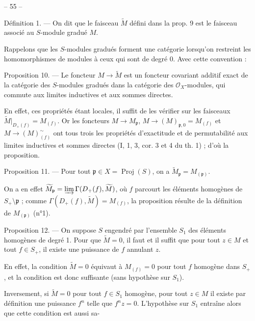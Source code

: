 \newpage


-- 55 --

Définition 1. — On dit que le faisceau $\widetilde{M}$ défini dans la prop. 9 est le faisceau associé au $S$-module gradué $M$.

Rappelons que les $S$-modules gradués forment une catégorie lorsqu'on restreint les homomorphismes de modules à ceux qui sont de degré 0. Avec cette convention :

Proposition 10. — Le foncteur $M \to \widetilde{M}$ est un foncteur covariant additif exact de la catégorie des $S$-modules gradués dans la catégorie des $\mathcal{O}_X$-modules, qui commute aux limites inductives et aux sommes directes.

En effet, ces propriétés étant locales, il suffit de les vérifier sur les faisceaux $\widetilde{M}|_{D_+(f)} = M_{(f)}$. Or les foncteurs $M \to M_{\mathfrak{p}}$, $M \to (M)_{\mathfrak{p},0} = M_{(f)}$ et $M \to (M)_{(f)}^\sim$ ont tous trois les propriétés d'exactitude et de permutabilité aux limites inductives et sommes directes (I, 1, 3, cor. 3 et 4 du th. 1) ; d'où la proposition.

Proposition 11. — Pour tout $\mathfrak{p} \in X = \operatorname{Proj}(S)$, on a $\widetilde{M}_{\mathfrak{p}} = M_{(\mathfrak{p})}$.

On a en effet $\widetilde{M}_{\mathfrak{p}} = \varinjlim \Gamma(D_+(f), \widetilde{M})$, où $f$ parcourt les éléments homogènes de $S_+ \setminus \mathfrak{p}$ ; comme $\Gamma(D_+(f), \widetilde{M}) = M_{(f)}$, la proposition résulte de la définition de $M_{(\mathfrak{p})}$ (n°1).

Proposition 12. — On suppose $S$ engendré par l'ensemble $S_1$ des éléments homogènes de degré 1. Pour que $\widetilde{M}=0$, il faut et il suffit que pour tout $z \in M$ et tout $f \in S_+$, il existe une puissance de $f$ annulant $z$.

En effet, la condition $\widetilde{M}=0$ équivaut à $M_{(f)}=0$ pour tout $f$ homogène dans $S_+$, et la condition est donc suffisante (sans hypothèse sur $S_1$).

Inversement, si $\widetilde{M}=0$ pour tout $f \in S_1$ homogène, pour tout $z \in M$ il existe par définition une puissance $f^n$ telle que $f^n z=0$. L'hypothèse sur $S_1$ entraîne alors que cette condition est aussi sa-

\newpage


